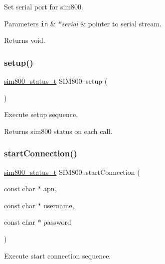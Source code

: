 Set serial port for sim800. 


\begin{DoxyParams}[1]{Parameters}
\mbox{\tt in}  & {\em $\ast$serial} & pointer to serial stream. \\
\hline
\end{DoxyParams}
\begin{DoxyReturn}{Returns}
void. 
\end{DoxyReturn}
\mbox{\label{classSIM800_af689d4460f01f57a910d4befc82b9b81}} 
\subsubsection{\texorpdfstring{setup()}{setup()}}
{\footnotesize\ttfamily \hyperlink{sim800_8h_a3d1eeaa095df003ea28385b81a134b27}{sim800\+\_\+status\+\_\+t} S\+I\+M800\+::setup (\begin{DoxyParamCaption}{ }\end{DoxyParamCaption})}



Execute setup sequence. 

\begin{DoxyReturn}{Returns}
sim800 status on each call. 
\end{DoxyReturn}
\mbox{\label{classSIM800_aef7d718949e714a45d2f671fbd14e804}} 
\subsubsection{\texorpdfstring{start\+Connection()}{startConnection()}}
{\footnotesize\ttfamily \hyperlink{sim800_8h_a3d1eeaa095df003ea28385b81a134b27}{sim800\+\_\+status\+\_\+t} S\+I\+M800\+::start\+Connection (\begin{DoxyParamCaption}\item[{const char $\ast$}]{apn,  }\item[{const char $\ast$}]{username,  }\item[{const char $\ast$}]{password }\end{DoxyParamCaption})}



Execute start connection sequence. 


